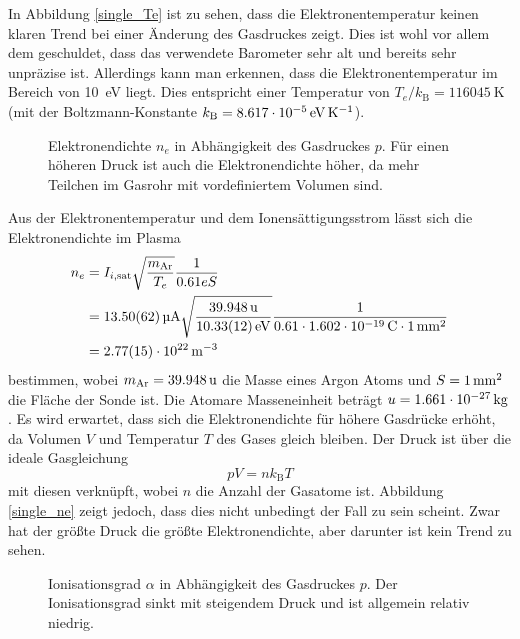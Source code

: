 In Abbildung \vref{single_Te} ist zu sehen, dass die Elektronentemperatur keinen klaren Trend bei einer \"Anderung des Gasdruckes zeigt.
Dies ist wohl vor allem dem geschuldet, dass das verwendete Barometer sehr alt und bereits sehr unpr\"azise ist.
Allerdings kann man erkennen, dass die Elektronentemperatur im Bereich von \SI{10}{\electronvolt} liegt.
Dies entspricht einer Temperatur von $T_e/k_\text{B}=\SI{116045}{\kelvin}$ (mit der Boltzmann-Konstante $k_\text{B}=\SI{8.617e-5}{\electronvolt\per\kelvin}$).

\begin{figure}[htbp]
    \centering
    
    \caption{
        Elektronendichte $n_e$ in Abh\"angigkeit des Gasdruckes $p$.
        F\"ur einen h\"oheren Druck ist auch die Elektronendichte h\"oher, da mehr Teilchen im Gasrohr mit vordefiniertem Volumen sind.
    }
    \label{single_ne}
\end{figure}
Aus der Elektronentemperatur und dem Ionens\"attigungsstrom l\"asst sich die Elektronendichte im Plasma
\begin{align}
n_e
    &=I_{i,\text{sat}}\sqrt{\frac{m_\text{Ar}}{T_e}}\frac{1}{0.61eS}\label{sne}\\
    &=\siAIisata\sqrt{\frac{\simAr}{\siATea}}\frac{1}{0.61\cdot \sie \cdot\siS}\nonumber\\
    &=\siAnea\nonumber
\end{align}
bestimmen, wobei $m_\text{Ar}=\simAr$ die Masse eines Argon Atoms und $S=\SI{1}{\milli\metre\squared}$ die Fl\"ache der Sonde ist.
Die Atomare Masseneinheit betr\"agt $u=\SI{1.661e-27}{\kilo\gram}$.
Es wird erwartet, dass sich die Elektronendichte f\"ur h\"ohere Gasdr\"ucke erh\"oht, da Volumen $V$ und Temperatur $T$ des Gases gleich bleiben.
Der Druck ist \"uber die ideale Gasgleichung
\begin{equation}
pV = nk_\text{B}T\label{idgas}
\end{equation}
mit diesen verkn\"upft, wobei $n$ die Anzahl der Gasatome ist.
Abbildung \vref{single_ne} zeigt jedoch, dass dies nicht unbedingt der Fall zu sein scheint.
Zwar hat der gr\"o\ss te Druck die gr\"o\ss te Elektronendichte, aber darunter ist kein Trend zu sehen.

\begin{figure}[htbp]
    \centering
    
    \caption{
        Ionisationsgrad $\alpha$ in Abh\"angigkeit des Gasdruckes $p$.
        Der Ionisationsgrad sinkt mit steigendem Druck und ist allgemein relativ niedrig.
    }
    \label{single_alpha}
\end{figure}

